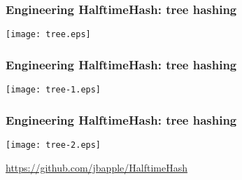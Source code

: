 \documentclass[xcolor=dvipsnames,hyperref={hidelinks}]{beamer}
\begin{document}
\begin{frame}
  \frametitle{Engineering HalftimeHash: tree hashing}
  \begin{center}
    \texttt{[image: tree.eps]}
  \end{center}
\end{frame}

\begin{frame}
  \frametitle{Engineering HalftimeHash: tree hashing}
  \begin{center}
    \texttt{[image: tree-1.eps]}
  \end{center}
\end{frame}

\begin{frame}
  \frametitle{Engineering HalftimeHash: tree hashing}
  \begin{center}
    \texttt{[image: tree-2.eps]}
  \end{center}
\end{frame}




\begin{frame}
  \begin{center}
    \url{https://github.com/jbapple/HalftimeHash}
  \end{center}
\end{frame}




\end{document}
